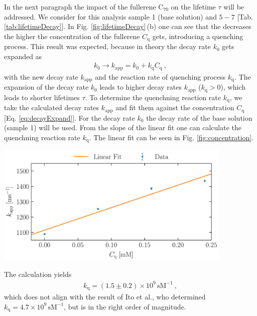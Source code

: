 In the next paragraph the impact of the fullerene $\mathrm{C}_{70}$ on the lifetime $\tau$ will be addressed. We consider for this analysis sample 1 (base solution) and $5-7$ [Tab. \ref{tab:lifetimeDecay}]. In Fig. \ref{fig:lifetimeDecay}\,(b) one can see that the decreases the higher the concentration of the fullerene $C_\mathrm{q}$ gets, introducing a quenching process. This result was expected, because in theory the decay rate $k_0$ gets expanded as
\begin{gather}
    k_0 \longrightarrow k_\mathrm{app} = k_0 + k_\mathrm{q}C_\mathrm{q}~,
    \label{eq:decayExpand}
\end{gather}
with the new decay rate $k_\mathrm{app}$ and the reaction rate of quenching process $k_\mathrm{q}$. The expansion of the decay rate $k_0$ leads to higher decay rates $k_\mathrm{app}$ ($k_\mathrm{q} > 0$), which leads to shorter lifetimes $\tau$. To determine the quenchning reaction rate $k_\mathrm{q}$, we take the calculated decay rates $k_\mathrm{app}$ and fit them against the concentration $C_\mathrm{q}$ [Eq. \ref{eq:decayExpand}]. For the decay rate $k_0$ the decay rate of the base solution (sample 1) will be used. From the slope of the linear fit one can calculate the quenchning reaction rate $k_\mathrm{q}$. The linear fit can be seen in Fig. \ref{fig:concentration}. 

\begin{center}
    \captionsetup{type = figure}
    \includegraphics[width = 0.85\textwidth]{Pictures/Evaluation/42/Concentration.pdf}
    \label{fig:concentration}
\end{center}

The calculation yields
\begin{gather*}
    \boxed{k_\mathrm{q} = (1.5 \pm 0.2) \times 10^9\,\mathrm{sM^{-1}}}~, %
\end{gather*}
which does not align with the result of Ito et al.\cite{Nojiri.1998}, who determined $k_\mathrm{q} = 4.7 \times 10^9\,\mathrm{sM^{-1}}$, but is in the right order of magnitude.

